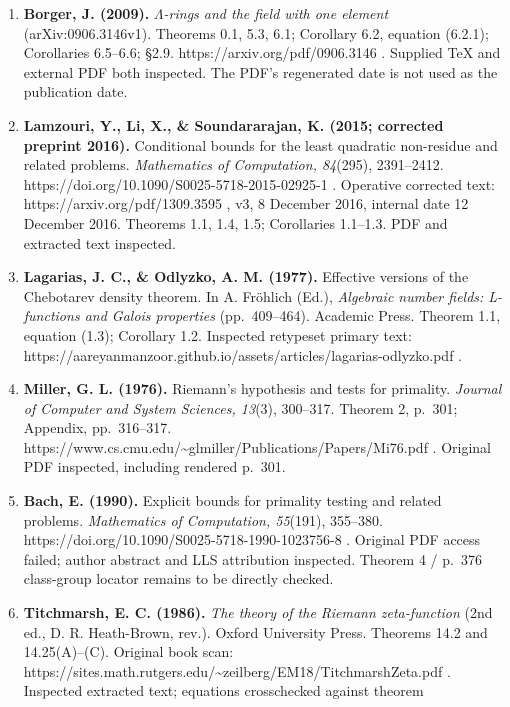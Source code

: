 \begin{enumerate}
\def\labelenumi{\arabic{enumi}.}
\item
  \textbf{Borger, J. (2009).} \emph{\(\Lambda\)-rings and the field with
  one element} (arXiv:0906.3146v1). Theorems 0.1, 5.3, 6.1; Corollary
  6.2, equation (6.2.1); Corollaries 6.5--6.6; §2.9.
  https://arxiv.org/pdf/0906.3146 . Supplied TeX and external PDF both
  inspected. The PDF's regenerated date is not used as the publication
  date.
\item
  \textbf{Lamzouri, Y., Li, X., \& Soundararajan, K. (2015; corrected
  preprint 2016).} Conditional bounds for the least quadratic
  non-residue and related problems. \emph{Mathematics of Computation,
  84}(295), 2391--2412. https://doi.org/10.1090/S0025-5718-2015-02925-1
  . Operative corrected text: https://arxiv.org/pdf/1309.3595 , v3, 8
  December 2016, internal date 12 December 2016. Theorems 1.1, 1.4, 1.5;
  Corollaries 1.1--1.3. PDF and extracted text inspected.
\item
  \textbf{Lagarias, J. C., \& Odlyzko, A. M. (1977).} Effective versions
  of the Chebotarev density theorem. In A. Fröhlich (Ed.),
  \emph{Algebraic number fields: L-functions and Galois properties}
  (pp.~409--464). Academic Press. Theorem 1.1, equation (1.3); Corollary
  1.2. Inspected retypeset primary text:
  https://aareyanmanzoor.github.io/assets/articles/lagarias-odlyzko.pdf
  .
\item
  \textbf{Miller, G. L. (1976).} Riemann's hypothesis and tests for
  primality. \emph{Journal of Computer and System Sciences, 13}(3),
  300--317. Theorem 2, p.~301; Appendix, pp.~316--317.
  https://www.cs.cmu.edu/\textasciitilde glmiller/Publications/Papers/Mi76.pdf
  . Original PDF inspected, including rendered p.~301.
\item
  \textbf{Bach, E. (1990).} Explicit bounds for primality testing and
  related problems. \emph{Mathematics of Computation, 55}(191),
  355--380. https://doi.org/10.1090/S0025-5718-1990-1023756-8 . Original
  PDF access failed; author abstract and LLS attribution inspected.
  Theorem 4 / p.~376 class-group locator remains to be directly checked.
\item
  \textbf{Titchmarsh, E. C. (1986).} \emph{The theory of the Riemann
  zeta-function} (2nd ed., D. R. Heath-Brown, rev.). Oxford University
  Press. Theorems 14.2 and 14.25(A)--(C). Original book scan:
  https://sites.math.rutgers.edu/\textasciitilde zeilberg/EM18/TitchmarshZeta.pdf
  . Inspected extracted text; equations crosschecked against theorem

\end{enumerate}
